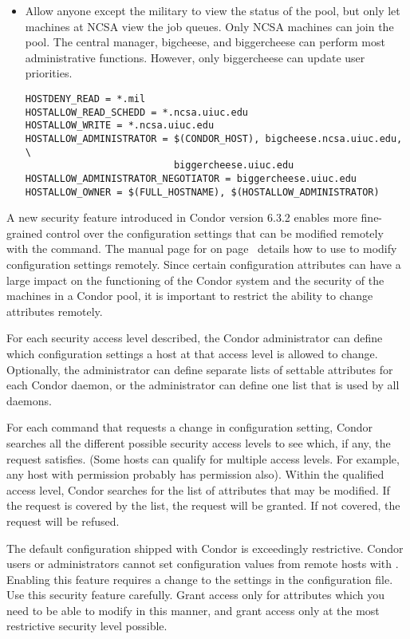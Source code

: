 \begin{itemize}
\item Allow anyone except the military to view the status of the
pool, but only let machines at NCSA view the job queues.
Only NCSA machines can join the pool.
The central manager, bigcheese, and
biggercheese can perform most administrative functions.
However, only biggercheese can update user priorities.
\footnotesize
\begin{verbatim}
HOSTDENY_READ = *.mil
HOSTALLOW_READ_SCHEDD = *.ncsa.uiuc.edu 
HOSTALLOW_WRITE = *.ncsa.uiuc.edu
HOSTALLOW_ADMINISTRATOR = $(CONDOR_HOST), bigcheese.ncsa.uiuc.edu, \
                          biggercheese.uiuc.edu
HOSTALLOW_ADMINISTRATOR_NEGOTIATOR = biggercheese.uiuc.edu
HOSTALLOW_OWNER = $(FULL_HOSTNAME), $(HOSTALLOW_ADMINISTRATOR)
\end{verbatim}
\normalsize

\end{itemize}

A new security feature introduced in
Condor version 6.3.2 enables more fine-grained control over the
configuration settings that can be modified remotely with the
 command.
The manual page for  on
page~\pageref{man-condor-config-val} details how to use 
\Condor{config\_val} to modify configuration settings remotely. 
Since certain configuration attributes can have a large impact on the 
functioning of the Condor system and the security of the machines in a
Condor pool, it is important to restrict the ability to change
attributes remotely.

For each security access level described,
the Condor
administrator can define which configuration settings a host at that
access level is allowed to change.
Optionally, the administrator can define separate lists of settable
attributes for each Condor daemon, or the administrator
can define one list that is used by all daemons.

For each command that requests a change in configuration setting,
Condor searches all the different possible security access
levels to see which, if any, the request satisfies.
(Some hosts can qualify for multiple access levels. For example, any
host with \DCPerm{ADMINISTRATOR} permission probably has
 permission also).
Within the qualified access level,
Condor searches for the list of attributes that may be modified.
If the request is covered by the list,
the request will be granted.
If not covered, the request will be refused.

The default configuration shipped with Condor is exceedingly
restrictive.
Condor users or administrators cannot set
configuration values from remote hosts with .
Enabling this feature requires a change to the
settings in the configuration file.
Use this security feature carefully.
Grant access only for attributes which you need to be able to modify
in this manner, and grant access only at the most restrictive
security level possible.

